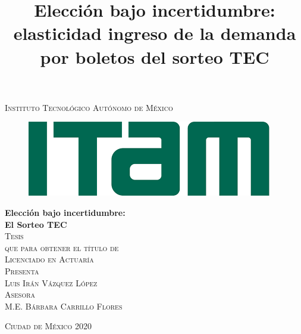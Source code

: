 \documentclass[11pt, oneside]{book}
\begin{document}

\title{Elección bajo incertidumbre: elasticidad ingreso de la demanda por boletos del sorteo TEC} %

\begin{titlepage}
\begin{center}

\textsc{\Large Instituto Tecnológico Autónomo de México}\\[2em]

\begin{figure}[h]
\begin{center}
\includegraphics[scale=0.50]{itam_logo.png}
\end{center}
\end{figure}


\textbf{\LARGE Elección bajo incertidumbre: \\El Sorteo TEC}\\[2em]

\textsc{\large Tesis}\\[1em]

\textsc{\large que para obtener el título de}\\[1em]

\textsc{\LARGE Licenciado en Actuaría}\\[1em]

\textsc{\large Presenta}\\[1em]

\textsc{\LARGE Luis Irán Vázquez López}\\[1em]

\textsc{\large Asesora}\\[1em]

\textsc{\LARGE M.E. Bárbara Carrillo Flores}\\[2em]


\end{center}

\vspace*{\fill}
\textsc{Ciudad de México \hspace*{\fill} 2020}

\end{titlepage}
\end{document}
